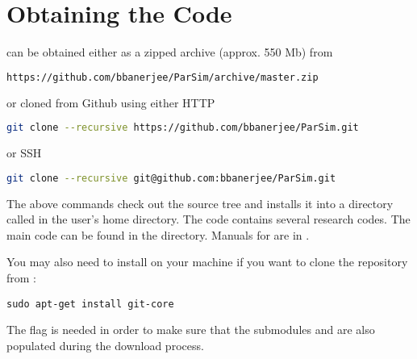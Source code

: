 \documentclass[11pt,fleqn]{book} %
\begin{document}
\section{Obtaining the Code}
\Vaango can be obtained either as a zipped archive (approx. 550 Mb) from
\begin{lstlisting}[language=sh, backgroundcolor=\color{background}]
https://github.com/bbanerjee/ParSim/archive/master.zip
\end{lstlisting}
or cloned from Github using either HTTP
\begin{lstlisting}[language=sh, backgroundcolor=\color{background}]
git clone --recursive https://github.com/bbanerjee/ParSim.git
\end{lstlisting}
or SSH
\begin{lstlisting}[language=sh, backgroundcolor=\color{background}]
git clone --recursive git@github.com:bbanerjee/ParSim.git
\end{lstlisting}
The above commands check out the \Parsim source tree and
installs it into a directory called  in the user's home
directory.  The \Parsim code contains several research codes.  The
main \Vaango code can be found in the 
directory.  Manuals for \Vaango are in .

You may also need to install  on your machine if you 
want to clone the repository from :
\begin{lstlisting}[backgroundcolor=\color{background}]
sudo apt-get install git-core
\end{lstlisting}

\begin{WarningBox}
The  flag is needed in order to make sure that the
submodules  and  are also populated
during the download process.
\end{WarningBox}
\end{document}
